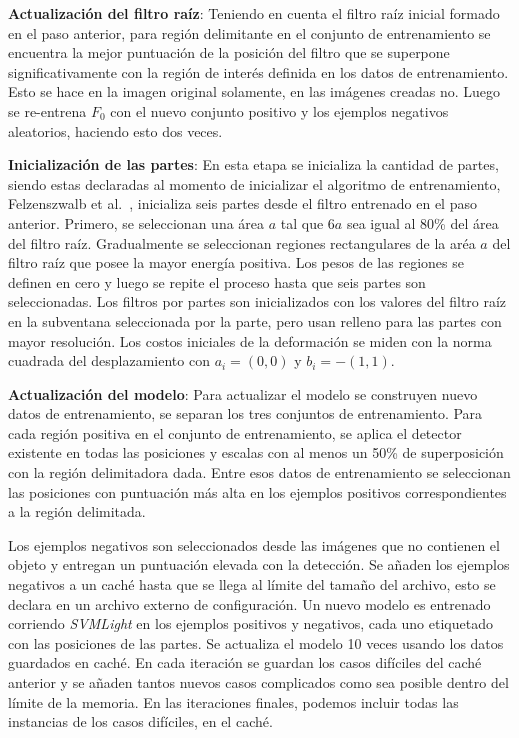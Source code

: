 \textbf{Actualización del filtro raíz}:
Teniendo en cuenta el filtro raíz inicial formado en el paso anterior, para región delimitante en el conjunto de entrenamiento se encuentra la mejor puntuación de la posición del filtro que se superpone significativamente con la región de interés definida en los datos de entrenamiento. Esto se hace en la imagen original solamente, en las imágenes creadas no. Luego se re-entrena $F_0$ con el nuevo conjunto positivo y los ejemplos negativos aleatorios, haciendo esto dos veces.

\textbf{Inicialización de las partes}:
En esta etapa se inicializa la cantidad de partes, siendo estas declaradas al momento de inicializar el algoritmo de entrenamiento, Felzenszwalb et al.~\cite{Felzenszwalb2008}, inicializa seis partes desde el filtro entrenado en el paso anterior. Primero, se seleccionan una área $a$ tal que $6a$ sea igual al 80\% del área del filtro raíz. Gradualmente se seleccionan regiones rectangulares de la aréa $a$ del filtro raíz que posee la mayor energía positiva. Los pesos de las regiones se definen en cero y luego se repite el proceso hasta que seis partes son seleccionadas. Los filtros por partes son inicializados con los valores del filtro raíz en la subventana seleccionada por la parte, pero usan relleno para las partes con mayor resolución. Los costos iniciales de la deformación se miden con la norma cuadrada del desplazamiento con $a_i=(0, 0)$ y $b_i=-(1, 1)$.

\textbf{Actualización del modelo}:
Para actualizar el modelo se construyen nuevo datos de entrenamiento, se separan los tres conjuntos de entrenamiento. Para cada región positiva en el conjunto de entrenamiento, se aplica el detector existente en todas las posiciones y escalas con al menos un 50\% de superposición con la región delimitadora dada. Entre esos datos de entrenamiento se seleccionan las posiciones con puntuación más alta en los ejemplos positivos correspondientes a la región delimitada.

Los ejemplos negativos son seleccionados desde las imágenes que no contienen el objeto y entregan un puntuación elevada con la detección. Se añaden los ejemplos negativos a un caché hasta que se llega al límite del tamaño del archivo, esto se declara en un archivo externo de configuración. Un nuevo modelo es entrenado corriendo \textit{SVMLight} en los ejemplos positivos y negativos, cada uno etiquetado con las posiciones de las partes. Se actualiza el modelo 10 veces usando los datos guardados en caché. En cada iteración se guardan los casos difíciles del caché anterior y se añaden tantos nuevos casos complicados como sea posible dentro del límite de la memoria. En las iteraciones finales, podemos incluir todas las instancias de los casos difíciles, en el caché.

